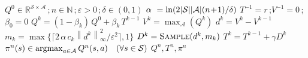 \documentclass{article}
\newcommand{\Argmax}{\mathop{\rm argmax}}
\newcommand{\cA}{\mathcal{A}}
\newcommand{\cS}{\mathcal{S}}
\newcommand{\real}{\mathbb{R}}
\newcommand{\NN}{\mathbb{N}}
\newcommand*{\infn}[1]{\left\|{#1}\right\|_{\infty}}
\newcommand{\maxA}{\mbox{$\max_\cA$}}
\newcommand{\R}{r}
\theoremstyle{plain}
\theoremstyle{definition}
\theoremstyle{remark}
\begin{document}
\begin{algorithm}[ht!]
   \caption{\mbox{\rm SAVID}$(Q^0,n,\varepsilon,\delta,\gamma)$}
   \label{alg:example-d}
\begin{algorithmic}
      $Q^{0}\!\in\real^{\cS\times\cA}$\,;\,$n\in\NN$\,;\,$\varepsilon>0$\,;\,$\delta\in(0,1)$
   \STATE $\alpha\hspace{0.8ex}=\ln(2|\cS||\cA|(n\!+\!1)/\delta)$
   \STATE $T^{-1}=\R$\,;\;$V^{-1}=0$\,;\,$\beta_0=0$
     \STATE $Q^{k} =(1\!-\!\beta_k)\,Q^0+\beta_k\, T^{k-1}$
     \STATE $V^k= \maxA(Q^{k})$
     \STATE $d^k=V^k-V^{k-1}$
    \STATE $m_k= \max\{\lceil 2\,\alpha\,c_k\infn{d^k}^2/\varepsilon^{2}\rceil,1\}$
     \STATE $D^k=\mbox{\sc Sample}(d^k, m_k)$ 
     \STATE $T^k=T^{k-1}+\gamma D^k$ 
   \ENDFOR
   \STATE $\pi^{n}(s) \in \Argmax_{a\in \cA} Q^{n}(s,a)\quad(\forall s\in\cS)$
    $Q^{n} ,T^n, \pi^{n} $ 
\end{algorithmic}
\end{algorithm}
\end{document}
